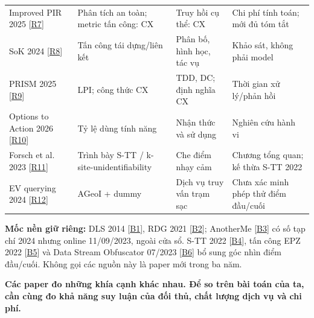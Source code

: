 \documentclass[10pt,a4paper]{article}
\newcommand{\key}[1]{\par\smallskip\noindent\colorbox{pale}{\parbox{\dimexpr\linewidth-2\fboxsep}{\textbf{#1}}}\par\smallskip}
\begin{document}
\begin{longtable}{@{}P{3.871cm}P{4.355cm}P{3.871cm}P{4.258cm}@{}}
\addlinespace[3pt]
Improved PIR 2025 [\hyperlink{ref-R7}{R7}] & Phân tích an toàn; metric tấn công: CX & Truy hồi cụ thể: CX & Chi phí tính toán; mới đủ tóm tắt\\
\addlinespace[3pt]
SoK 2024 [\hyperlink{ref-R8}{R8}] & Tấn công tái dựng/liên kết & Phân bố, hình học, tác vụ & Khảo sát, không phải model\\
\addlinespace[3pt]
PRISM 2025 [\hyperlink{ref-R9}{R9}] & LPI; công thức CX & TDD, DC; định nghĩa CX & Thời gian xử lý/phản hồi\\
\addlinespace[3pt]
Options to Action 2026 [\hyperlink{ref-R10}{R10}] & Tỷ lệ dùng tính năng & Nhận thức và sử dụng & Nghiên cứu hành vi\\
\addlinespace[3pt]
Forsch et al. 2023 [\hyperlink{ref-R11}{R11}] & Trình bày S-TT / k-site-unidentifiability & Che điểm nhạy cảm & Chương tổng quan; kế thừa S-TT 2022\\
\addlinespace[3pt]
EV querying 2024 [\hyperlink{ref-R12}{R12}] & AGeoI + dummy & Dịch vụ truy vấn trạm sạc & Chưa xác minh phép thử điểm đầu/cuối\\
\end{longtable}
\endgroup
\textbf{Mốc nền giữ riêng:} DLS 2014 [\hyperlink{ref-B1}{B1}], RDG 2021 [\hyperlink{ref-B2}{B2}]; AnotherMe [\hyperlink{ref-B3}{B3}] có số tạp chí 2024 nhưng online 11/09/2023, ngoài cửa sổ. S-TT 2022 [\hyperlink{ref-B4}{B4}], tấn công EPZ 2022 [\hyperlink{ref-B5}{B5}] và Data Stream Obfuscator 07/2023 [\hyperlink{ref-B6}{B6}] bổ sung góc nhìn điểm đầu/cuối. Không gọi các nguồn này là paper mới trong ba năm.

\key{Các paper đo những khía cạnh khác nhau. Để so trên bài toán của ta, cần cùng đo khả năng suy luận của đối thủ, chất lượng dịch vụ và chi phí.}


\clearpage
\end{document}
